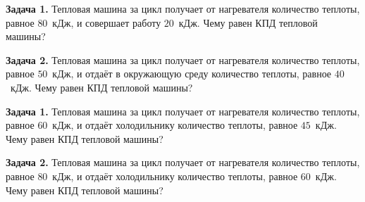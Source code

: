
\begin{taskbasic}[code={\label{task:mkt_eff_v5_n8}}]
\textbf{Задача 1.} Тепловая машина за цикл получает от нагревателя количество теплоты, равное $80$~кДж, и совершает работу $20$~кДж. Чему равен КПД тепловой машины?

\end{taskbasic}

\begin{taskbasic}[code={\label{task:mkt_eff_v6_n8}}]
\textbf{Задача 2.} Тепловая машина за цикл получает от нагревателя количество теплоты, равное $50$~кДж, и отдаёт в окружающую среду количество теплоты, равное $40$~кДж. Чему равен КПД тепловой машины?

\end{taskbasic}


\begin{taskbasic}[code={\label{task:mkt_eff_v17_n8}}]
\textbf{Задача 1.} Тепловая машина за цикл получает от нагревателя количество теплоты, равное $60$~кДж, и отдаёт холодильнику количество теплоты, равное $45$~кДж. Чему равен КПД тепловой машины?

\end{taskbasic}

\begin{taskbasic}[code={\label{task:mkt_eff_v18_n8}}]
\textbf{Задача 2.} Тепловая машина за цикл получает от нагревателя количество теплоты, равное $80$~кДж, и отдаёт холодильнику количество теплоты, равное $60$~кДж. Чему равен КПД тепловой машины?

\end{taskbasic}


